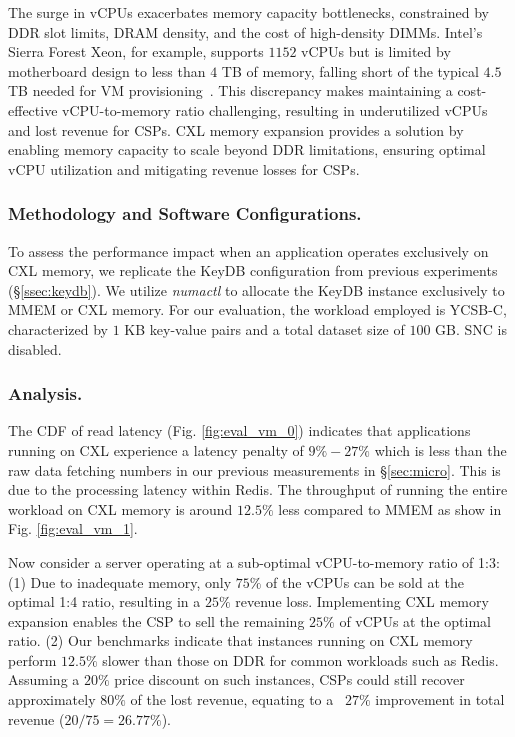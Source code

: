 The surge in vCPUs exacerbates memory capacity bottlenecks, constrained by DDR slot limits, DRAM density, and the cost of high-density DIMMs. Intel's Sierra Forest Xeon, for example, supports $1152$ vCPUs but is limited by motherboard design to less than $4$ TB of memory, falling short of the typical $4.5$ TB needed for VM provisioning~\cite{1dpc}. This discrepancy makes maintaining a cost-effective vCPU-to-memory ratio challenging, resulting in underutilized vCPUs and lost revenue for CSPs. CXL memory expansion provides a solution by enabling memory capacity to scale beyond DDR limitations, ensuring optimal vCPU utilization and mitigating revenue losses for CSPs.

\subsubsection{Methodology and Software Configurations.}

To assess the performance impact when an application operates exclusively on CXL memory, we replicate the KeyDB configuration from previous experiments (\S\ref{ssec:keydb}). We utilize \textit{numactl} to allocate the KeyDB instance exclusively to MMEM or CXL memory. For our evaluation, the workload employed is YCSB-C, characterized by $1$ KB key-value pairs and a total dataset size of $100$ GB. SNC is disabled.

\subsubsection{Analysis.}
The CDF of read latency (Fig. \ref{fig:eval_vm_0}) indicates that applications running on CXL experience a latency penalty of $9\%-27\%$ which is less than the raw data fetching numbers in our previous measurements in \S\ref{sec:micro}. This is due to the processing latency within Redis. The throughput of running the entire workload on CXL memory is around $12.5\%$ less compared to MMEM as show in Fig. \ref{fig:eval_vm_1}.

Now consider a server operating at a sub-optimal vCPU-to-memory ratio of 1:3:
(1) Due to inadequate memory, only $75\%$ of the vCPUs can be sold at the optimal 1:4 ratio, resulting in a $25\%$ revenue loss. Implementing CXL memory expansion enables the CSP to sell the remaining $25\%$ of vCPUs at the optimal ratio.
(2) Our benchmarks indicate that instances running on CXL memory perform $12.5\%$ slower than those on DDR for common workloads such as Redis. Assuming a $20\%$ price discount on such instances, CSPs could still recover approximately $80\%$ of the lost revenue, equating to a ~$27\%$ improvement in total revenue ($20/75 = 26.77\%$).

